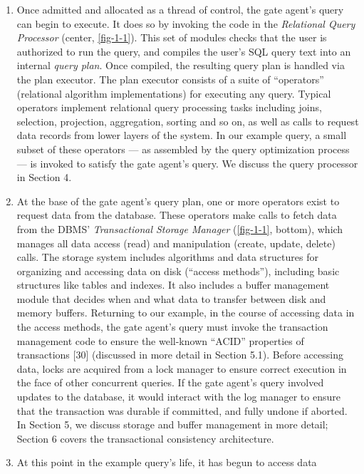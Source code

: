 \documentclass[a4paper,11pt,twoside,openright]{book}
\begin{document}
\begin{enumerate}
  \item
    Once admitted and allocated as a thread of control, the gate agent's
    query can begin to execute. It does so by invoking the code in the
    \emph{Relational Query Processor} (center, \autoref{fig-1-1}). This set of
    modules checks that the user is authorized to run the query, and
    compiles the user's SQL query text into an internal \emph{query
    plan}. Once compiled, the resulting query plan is handled via the
    plan executor. The plan executor consists of a suite of
    ``operators'' (relational algorithm implementations) for executing
    any query. Typical operators implement relational query processing
    tasks including joins, selection, projection, aggregation, sorting
    and so on, as well as calls to request data records from lower
    layers of the system. In our example query, a small subset of these
    operators --- as assembled by the query optimization process --- is
    invoked to satisfy the gate agent's query. We discuss the query
    processor in Section 4.
  \item
    At the base of the gate agent's query plan, one or more operators
    exist to request data from the database. These operators make calls
    to fetch data from the DBMS' \emph{Transactional Storage Manager}
    (\autoref{fig-1-1}, bottom), which manages all data access (read) and
    manipulation (create, update, delete) calls. The storage system
    includes algorithms and data structures for organizing and accessing
    data on disk (``access methods''), including basic structures like
    tables and indexes. It also includes a buffer management module that
    decides when and what data to transfer between disk and memory
    buffers. Returning to our example, in the course of accessing data
    in the access methods, the gate agent's query must invoke the
    transaction management code to ensure the well-known ``ACID''
    properties of transactions {[}30{]} (discussed in more detail in
    Section 5.1). Before accessing data, locks are acquired from a lock
    manager to ensure correct execution in the face of other concurrent
    queries. If the gate agent's query involved updates to the database,
    it would interact with the log manager to ensure that the
    transaction was durable if committed, and fully undone if aborted.
    In Section 5, we discuss storage and buffer management in more
    detail; Section 6 covers the transactional consistency architecture.
\item
  At this point in the example query's life, it has begun to access data

\end{enumerate}
\end{document}
